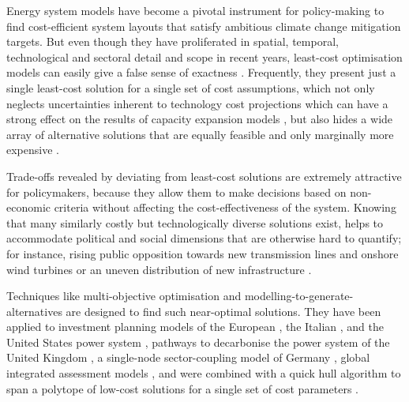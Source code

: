
Energy system models have become a pivotal instrument for policy-making to find
cost-efficient system layouts that satisfy ambitious climate change mitigation
targets. But even though they have proliferated in spatial, temporal,
technological and sectoral detail and scope in recent years, least-cost
optimisation models can easily give a false sense of exactness
\cite{Trutnevyte2016, pye_modelling_2020}. Frequently, they present just a
single least-cost solution for a single set of cost assumptions, which not only
neglects uncertainties inherent to technology cost projections which can have a
strong effect on the results of capacity expansion models
\cite{trondle_trade-offs_2020, yue_review_2018, pye_assessing_2018}, but also
hides a wide array of alternative solutions that are equally feasible and only
marginally more expensive \cite{nearoptimal, lombardi_policy_2020,
sasse_regional_2020}.


Trade-offs revealed by deviating from least-cost solutions are extremely
attractive for policymakers, because they allow them to make decisions based on
non-economic criteria without affecting the cost-effectiveness of the system.
Knowing that many similarly costly but technologically diverse solutions exist,
helps to accommodate political and social dimensions that are otherwise hard to
quantify; for instance, rising public opposition towards new transmission
lines and onshore wind turbines or an uneven distribution of new infrastructure
\cite{mccollum_energy_2020,sasse_regional_2020,schlachtberger_cost_2018}.


Techniques like multi-objective optimisation and
modelling-to-generate-alternatives are designed to find such near-optimal
solutions. They have been applied to investment planning models of
the European \cite{nearoptimal}, the Italian
\cite{lombardi_policy_2020}, and the United States power system
\cite{DeCarolis2016}, pathways to decarbonise the power system of the United
Kingdom \cite{Li2017}, a single-node sector-coupling model of Germany
\cite{nacken_integrated_2019}, global integrated assessment models
\cite{Price2017}, and were combined with a quick hull algorithm to span a
polytope of low-cost solutions for a single set of cost parameters
\cite{pedersen_modeling_2020}.


